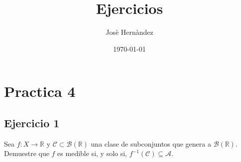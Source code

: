 \documentclass{article}
\title{Ejercicios}
\author{Josè Hernàndez}
\date{\today}
\begin{document}
\maketitle

\section*{Practica 4}

\subsection*{Ejercicio 1} \hfill

Sea \( f \colon X \to \mathbb{R} \) y \( \mathcal{C} \subset \mathcal{B}(\mathbb{R}) \) una clase de subconjuntos
que genera a \( \mathcal{B}(\mathbb{R}) \). Demuestre que \( f \) es medible si, y solo si,
\( f^{-1}(\mathcal{C}) \subseteq \mathcal{A} \).
\bigskip
\end{document}
